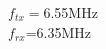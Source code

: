 \documentclass[preview]{standalone}
\begin{document}
\begin{center}
$f_{tx}=$6.55MHz\\$f_{rx}$=6.35MHz
\end{center}
\end{document}
